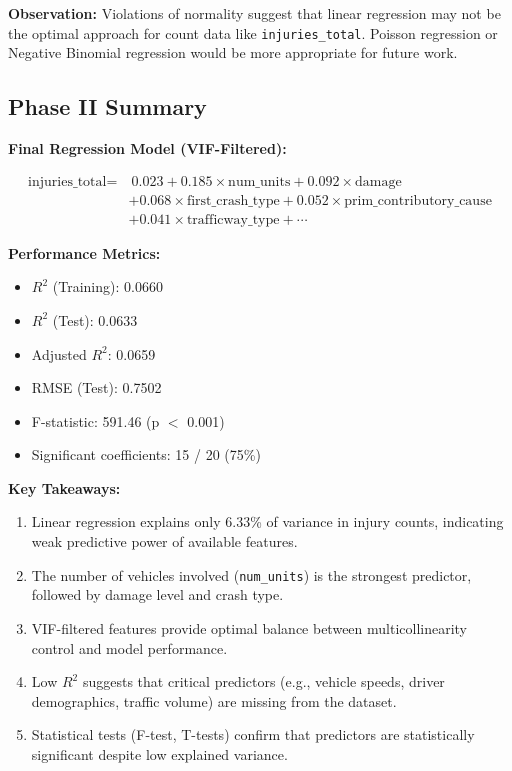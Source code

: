 \documentclass[12pt,man]{apa7}
\begin{document}
\textbf{Observation:} Violations of normality suggest that linear regression may not be the optimal approach for count data like \texttt{injuries\_total}. Poisson regression or Negative Binomial regression would be more appropriate for future work.

\subsection{Phase II Summary}

\textbf{Final Regression Model (VIF-Filtered):}

\begin{equation}
\begin{aligned}
\text{injuries\_total} = & \ 0.023 + 0.185 \times \text{num\_units} + 0.092 \times \text{damage} \\
& + 0.068 \times \text{first\_crash\_type} + 0.052 \times \text{prim\_contributory\_cause} \\
& + 0.041 \times \text{trafficway\_type} + \cdots
\end{aligned}
\end{equation}

\textbf{Performance Metrics:}
\begin{itemize}
    \item $R^2$ (Training): 0.0660
    \item $R^2$ (Test): 0.0633
    \item Adjusted $R^2$: 0.0659
    \item RMSE (Test): 0.7502
    \item F-statistic: 591.46 (p $<$ 0.001)
    \item Significant coefficients: 15 / 20 (75\%)
\end{itemize}

\textbf{Key Takeaways:}
\begin{enumerate}
    \item Linear regression explains only 6.33\% of variance in injury counts, indicating weak predictive power of available features.
    \item The number of vehicles involved (\texttt{num\_units}) is the strongest predictor, followed by damage level and crash type.
    \item VIF-filtered features provide optimal balance between multicollinearity control and model performance.
    \item Low $R^2$ suggests that critical predictors (e.g., vehicle speeds, driver demographics, traffic volume) are missing from the dataset.
    \item Statistical tests (F-test, T-tests) confirm that predictors are statistically significant despite low explained variance.
\end{enumerate}
\end{document}

